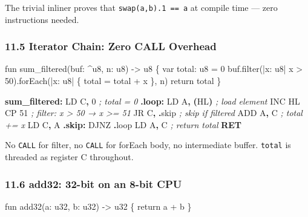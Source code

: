 \documentclass[
  11pt,
  a4paper,
]{report}
\newenvironment{Shaded}{\begin{snugshade}\small}{\end{snugshade}}
\newcommand{\BuiltInTok}[1]{#1}
\newcommand{\CommentTok}[1]{\textcolor[rgb]{0.56,0.35,0.01}{\textit{#1}}}
\newcommand{\ControlFlowTok}[1]{\textcolor[rgb]{0.13,0.29,0.53}{\textbf{#1}}}
\newcommand{\DecValTok}[1]{\textcolor[rgb]{0.00,0.00,0.81}{#1}}
\newcommand{\FunctionTok}[1]{\textcolor[rgb]{0.13,0.29,0.53}{\textbf{#1}}}
\newcommand{\NormalTok}[1]{#1}
\newcommand{\OperatorTok}[1]{\textcolor[rgb]{0.81,0.36,0.00}{\textbf{#1}}}
\begin{document}
The trivial inliner proves that \texttt{swap(a,b).1\ ==\ a} at compile
time --- zero instructions needed.

\subsubsection{11.5 Iterator Chain: Zero CALL
Overhead}\label{iterator-chain-zero-call-overhead}

\begin{Shaded}
\begin{Highlighting}[]
\NormalTok{fun sum\_filtered(buf: \^{}u8, n: u8) {-}\textgreater{} u8 \{}
\NormalTok{    var total: u8 = 0}
\NormalTok{    buf.filter(|x: u8| x \textgreater{} 50).forEach(|x: u8| \{ total = total + x \}, n)}
\NormalTok{    return total}
\NormalTok{\}}
\end{Highlighting}
\end{Shaded}

\begin{Shaded}
\begin{Highlighting}[]
\FunctionTok{sum\_filtered:}
\NormalTok{    LD C}\OperatorTok{,} \DecValTok{0}          \CommentTok{; total = 0}
\FunctionTok{.loop:}
\NormalTok{    LD A}\OperatorTok{,} \OperatorTok{(}\NormalTok{HL}\OperatorTok{)}       \CommentTok{; load element}
    \BuiltInTok{INC}\NormalTok{ HL}
\NormalTok{    CP }\DecValTok{51}            \CommentTok{; filter: x \textgreater{} 50 → x \textgreater{}= 51}
\NormalTok{    JR C}\OperatorTok{,} \OperatorTok{.}\NormalTok{skip      }\CommentTok{; skip if filtered}
    \BuiltInTok{ADD}\NormalTok{ A}\OperatorTok{,}\NormalTok{ C         }\CommentTok{; total += x}
\NormalTok{    LD C}\OperatorTok{,}\NormalTok{ A}
\FunctionTok{.skip:}
\NormalTok{    DJNZ }\OperatorTok{.}\NormalTok{loop}
\NormalTok{    LD A}\OperatorTok{,}\NormalTok{ C          }\CommentTok{; return total}
    \ControlFlowTok{RET}
\end{Highlighting}
\end{Shaded}

No \texttt{CALL} for filter, no \texttt{CALL} for forEach body, no
intermediate buffer. \texttt{total} is threaded as register C
throughout.

\subsubsection{11.6 add32: 32-bit on an 8-bit
CPU}\label{add32-32-bit-on-an-8-bit-cpu}

\begin{Shaded}
\begin{Highlighting}[]
\NormalTok{fun add32(a: u32, b: u32) {-}\textgreater{} u32 \{ return a + b \}}
\end{Highlighting}
\end{Shaded}
\end{document}

